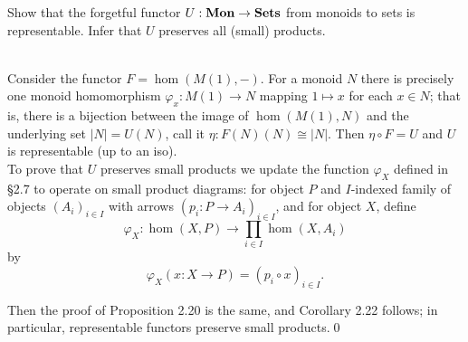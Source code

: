 \clearpage
\begin{BookProblem}{18}
  Show that the forgetful functor \(U : \mathbf{{Mon}} \to \mathbf{{Sets}}\) from monoids to sets is
  representable. Infer that \(U\) preserves all (small) products.
  \begin{Solution}
    \\

    Consider the functor \(F = \hom(M(1), -)\). For a monoid \(N\) there is
    precisely one monoid homomorphism \(\varphi_x : M(1) \to N\) mapping \(1
    \mapsto x\) for each \(x \in N\); that is, there is a bijection between
    the image of \(\hom(M(1), N)\) and the underlying set \(|N| = U(N)\), call
    it \(\eta : F(N)(N) \cong |N|\). Then \(\eta \circ F = U\) and \(U\)
    is representable (up to an iso).\\

    To prove that \(U\) preserves small products we update the function
    \(\varphi_X\) defined in \S2.7 to operate on small product diagrams: for object
    \(P\) and \(I\)-indexed family of objects \({(A_i)}_{i \in I}\) with arrows
    \({(p_i : P \to A_i)}_{i \in I}\), and for object \(X\), define 
    \[\varphi_X : \hom(X, P) \to \prod_{i \in I} \hom(X, A_i)\]
    by
    \[\varphi_X(x:X \to P) = {(p_i \circ x)}_{i \in I}.\]

    Then the proof of Proposition 2.20 is the same, and Corollary 2.22 follows;
    in particular, representable functors preserve small products.\qed{}
  \end{Solution}
\end{BookProblem}


